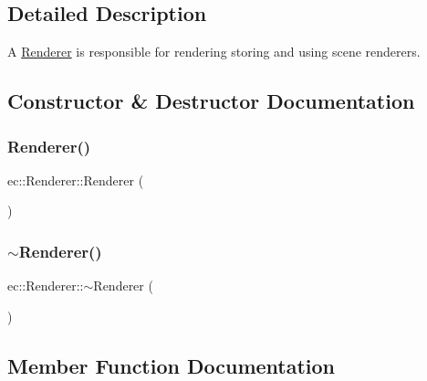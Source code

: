 \subsection{Detailed Description}
A \mbox{\hyperlink{classec_1_1_renderer}{Renderer}} is responsible for rendering storing and using scene renderers. 

\subsection{Constructor \& Destructor Documentation}
\mbox{\label{classec_1_1_renderer_a1bb0d9ff47eabce408daff8ab55bf4dc}} 
\subsubsection{\texorpdfstring{Renderer()}{Renderer()}}
{\footnotesize\ttfamily ec\+::\+Renderer\+::\+Renderer (\begin{DoxyParamCaption}{ }\end{DoxyParamCaption})\hspace{0.3cm}{\ttfamily [explicit]}}

\mbox{\label{classec_1_1_renderer_ab0a97bd174127b670899477a576d1fe6}} 
\subsubsection{\texorpdfstring{$\sim$\+Renderer()}{~Renderer()}}
{\footnotesize\ttfamily ec\+::\+Renderer\+::$\sim$\+Renderer (\begin{DoxyParamCaption}{ }\end{DoxyParamCaption})}



\subsection{Member Function Documentation}
\mbox{\label{classec_1_1_renderer_a8c84ae50f78cd6a4ed913d228716ad9b}} 
